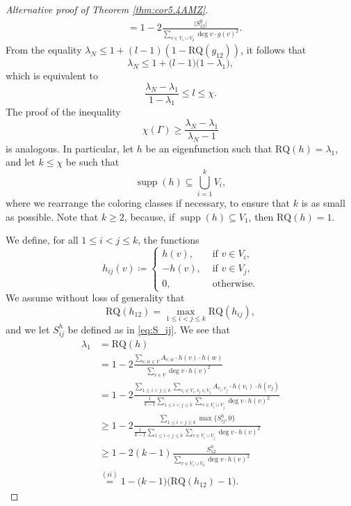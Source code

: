 \documentclass{article}
\newcommand{\RQ}{\textrm{RQ}}
\DeclareMathOperator{\supp}{supp}
\theoremstyle{plain}
\newcommand\ddfrac[2]{\frac{\displaystyle #1}{\displaystyle #2}}
\theoremstyle{definition}
\theoremstyle{remark}
\begin{document}
\begin{proof}[Alternative proof of Theorem \ref{thm:cor5.4AMZ}]
\begin{align*}
        &= 1-2\frac{\bigl|S_{12}^g\bigr|}{\sum_{v\in V_1\cup V_2}\deg v\cdot g(v)^2}.
    \end{align*}
    From the equality $\lambda_N\leq 1+(l-1)(1-\RQ(g_{12}))$, it follows that
    \begin{equation*}
        \lambda_N \leq 1+\bigl( l-1\bigr)\bigl(1-\lambda_1\bigr),
    \end{equation*}
     which is equivalent to
    \begin{equation}\label{eq:inequality1.1}
        \frac{\lambda_N-\lambda_1}{1-\lambda_1} \leq l \leq \chi.
    \end{equation}
    The proof of the inequality
    \[
    \chi(\Gamma) \geq \frac{\lambda_N-\lambda_1}{\lambda_N-1}
    \]
    is analogous. In particular, let $h$ be an eigenfunction such that $\RQ(h) = \lambda_1$, and let $k\leq \chi$ be such that
    \[
    \supp(h)\subseteq \bigcup_{i=1}^kV_i,
    \]
    where we rearrange the coloring classes if necessary, to ensure that $k$ is as small as possible. Note that $k\geq2$, because, if $\supp(h)\subseteq V_1$, then $\RQ(h)= 1$.

    
    We define, for all $1\leq i<j\leq k$, the functions
    \begin{equation}\label{eq:h_ij}
     h_{ij}(v)\coloneqq \begin{cases}
        h(v), &\text{ if } v\in V_i,\\
        - h(v), &\text{ if } v\in V_j,\\
        0, &\text{ otherwise.}
    \end{cases}
    \end{equation}
    We assume without loss of generality that
    \[
    \RQ( h_{12}) = \max_{1\leq i<j\leq k}\RQ(h_{ij}),
    \]
    and we let $S^h_{ij}$ be defined as in \cref{eq:S_ij}. We see that
    \begin{align*}
        \lambda_1 &= \RQ(h) \\&= 1 - 2\ddfrac{\sum_{v,w\in V}A_{v,w}\cdot h(v)\cdot h(w)}{\sum_{v\in V}\deg v\cdot h(v)^2}\\
        &= 1 - 2\ddfrac{\sum_{1\leq i<j\leq  k}\sum_{v_i\in V_i,v_j\in V_j}A_{v_i,v_j}\cdot h(v_i)\cdot h(v_j)}{\frac1{ k-1}\sum_{1\leq i< j\leq  k}\sum_{v\in V_i\cup V_j}\deg v \cdot h(v)^2}\\
        &\geq 1 - 2\ddfrac{\sum_{1\leq i<j\leq  k}\max\bigl\{S^h_{ij},0\bigr\}}{\frac1{ k-1}\sum_{1\leq i< j\leq  k}\sum_{v\in V_i\cup V_j}\deg v \cdot h(v)^2}\\
        &\geq 1 - 2( k-1)\ddfrac{S_{12}^h}{\sum_{v\in V_1\cup V_2}\deg v \cdot h(v)^2}\\
        &\overset{(ii)}{=} 1-\bigl( k-1\bigr)\bigl(\RQ(h_{12})-1\bigr).
    \end{align*}     
        

\end{proof}
\end{document}
